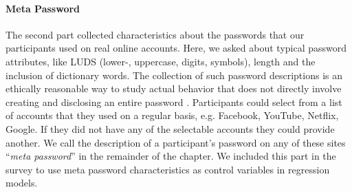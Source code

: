 \paragraph{Meta Password} The second part collected characteristics about the passwords that our participants used on real online accounts. Here, we asked about typical password attributes, like LUDS (lower-, uppercase, digits, symbols), length and the inclusion of dictionary words. The collection of such password descriptions is an ethically reasonable way to study actual behavior that does not directly involve creating and disclosing an entire password \cite{VonZezschwitz2013SurvivalShortest}. Participants could select from a list of accounts that they used on a regular basis, e.g. Facebook, YouTube, Netflix, Google. If they did not have any of the selectable accounts they could provide another. We call the description of a participant's password on any of these sites ``\textit{meta password}'' in the remainder of the chapter. We included this part in the survey to use meta password characteristics as control variables in regression models.



